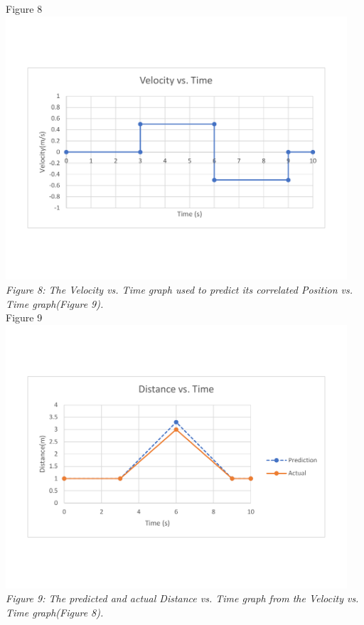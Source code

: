 \documentclass[aps,letterpaper,11pt]{revtex4}
\begin{document}
\newpage
\begin{center}
Figure 8\\
\vspace{-10mm}
\includegraphics[width=5in]{VelocityvsTimeGraphUsedtoPredict.pdf}\\
\vspace{-10mm}
\textit{Figure 8: The Velocity vs. Time graph used to predict its correlated Position vs. Time graph(Figure 9).}\\
Figure 9\\
\vspace{-10mm}
\includegraphics[width=5in]{PositionvsTimeGraphForTheVPrediction.pdf}\\
\vspace{-10mm}
\textit{Figure 9: The predicted and actual Distance vs. Time graph from the Velocity vs. Time graph(Figure 8).}
\newpage
\end{center}
\end{document}
